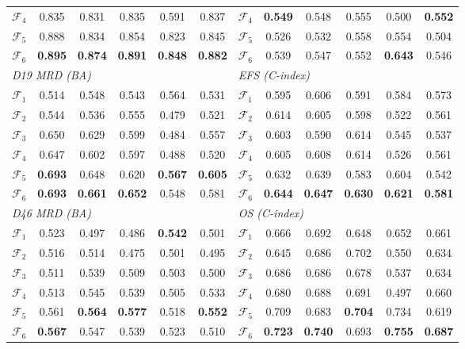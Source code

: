 \documentclass[pdflatex,sn-nature]{sn-jnl}
\begin{document}
\begin{appendices}
\begin{table}[!t]
\begin{tabular}{@{}l ccccc @{\hskip 1.2em} l ccccc@{}}
$\mathcal{F}_4$ & 0.835 & 0.831 & 0.835 & 0.591 & 0.837 & $\mathcal{F}_4$ & \textbf{0.549} & 0.548 & 0.555 & 0.500 & \textbf{0.552} \\
$\mathcal{F}_5$ & 0.888 & 0.834 & 0.854 & 0.823 & 0.845 & $\mathcal{F}_5$ & 0.526 & 0.532 & 0.558 & 0.554 & 0.504 \\
$\mathcal{F}_6$ & \textbf{0.895} & \textbf{0.874} & \textbf{0.891} & \textbf{0.848} & \textbf{0.882} & $\mathcal{F}_6$ & 0.539 & 0.547 & 0.552 & \textbf{0.643} & 0.546 \\
\multicolumn{6}{l}{\textit{D19 MRD (BA)}} & \multicolumn{6}{l}{\textit{EFS (C-index)}} \\
$\mathcal{F}_1$ & 0.514 & 0.548 & 0.543 & 0.564 & 0.531 & $\mathcal{F}_1$ & 0.595 & 0.606 & 0.591 & 0.584 & 0.573 \\
$\mathcal{F}_2$ & 0.544 & 0.536 & 0.555 & 0.479 & 0.521 & $\mathcal{F}_2$ & 0.614 & 0.605 & 0.598 & 0.522 & 0.561 \\
$\mathcal{F}_3$ & 0.650 & 0.629 & 0.599 & 0.484 & 0.557 & $\mathcal{F}_3$ & 0.603 & 0.590 & 0.614 & 0.545 & 0.537 \\
$\mathcal{F}_4$ & 0.647 & 0.602 & 0.597 & 0.488 & 0.520 & $\mathcal{F}_4$ & 0.605 & 0.608 & 0.614 & 0.526 & 0.561 \\
$\mathcal{F}_5$ & \textbf{0.693} & 0.648 & 0.620 & \textbf{0.567} & \textbf{0.605} & $\mathcal{F}_5$ & 0.632 & 0.639 & 0.583 & 0.604 & 0.542 \\
$\mathcal{F}_6$ & \textbf{0.693} & \textbf{0.661} & \textbf{0.652} & 0.548 & 0.581 & $\mathcal{F}_6$ & \textbf{0.644} & \textbf{0.647} & \textbf{0.630} & \textbf{0.621} & \textbf{0.581} \\
\multicolumn{6}{l}{\textit{D46 MRD (BA)}} & \multicolumn{6}{l}{\textit{OS (C-index)}} \\
$\mathcal{F}_1$ & 0.523 & 0.497 & 0.486 & \textbf{0.542} & 0.501 & $\mathcal{F}_1$ & 0.666 & 0.692 & 0.648 & 0.652 & 0.661 \\
$\mathcal{F}_2$ & 0.516 & 0.514 & 0.475 & 0.501 & 0.495 & $\mathcal{F}_2$ & 0.645 & 0.686 & 0.702 & 0.550 & 0.634 \\
$\mathcal{F}_3$ & 0.511 & 0.539 & 0.509 & 0.503 & 0.500 & $\mathcal{F}_3$ & 0.686 & 0.686 & 0.678 & 0.537 & 0.634 \\
$\mathcal{F}_4$ & 0.513 & 0.545 & 0.539 & 0.505 & 0.533 & $\mathcal{F}_4$ & 0.680 & 0.688 & 0.691 & 0.497 & 0.660 \\
$\mathcal{F}_5$ & 0.561 & \textbf{0.564} & \textbf{0.577} & 0.518 & \textbf{0.552} & $\mathcal{F}_5$ & 0.709 & 0.683 & \textbf{0.704} & 0.734 & 0.619 \\
$\mathcal{F}_6$ & \textbf{0.567} & 0.547 & 0.539 & 0.523 & 0.510 & $\mathcal{F}_6$ & \textbf{0.723} & \textbf{0.740} & 0.693 & \textbf{0.755} & \textbf{0.687} \\
\bottomrule
\end{tabular}
\end{table}


\end{appendices}
\end{document}

